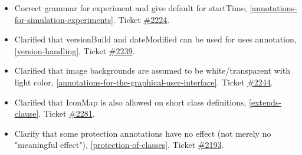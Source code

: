\begin{itemize}
\begin{itemize}
\item Correct grammar for experiment and give default for startTime, \cref{annotations-for-simulation-experiments}.
Ticket \href{https://github.com/modelica/ModelicaSpecification/issues/2224}{\#2224}.
\item Clarified that versionBuild and dateModified can be used for uses annotation, \cref{version-handling}.
Ticket \href{https://github.com/modelica/ModelicaSpecification/issues/2239}{\#2239}.
\item Clarified that image backgrounds are assumed to be white/transparent with light color, \cref{annotations-for-the-graphical-user-interface}.
Ticket \href{https://github.com/modelica/ModelicaSpecification/issues/2244}{\#2244}.
\item Clarified that IconMap is also allowed on short class definitions, \cref{extends-clause}.
Ticket \href{https://github.com/modelica/ModelicaSpecification/issues/2281}{\#2281}.
\item Clarify that some protection annotations have no effect (not merely no "meaningful effect"), \cref{protection-of-classes}.
Ticket \href{https://github.com/modelica/ModelicaSpecification/issues/2193}{\#2193}.
\end{itemize}


\end{itemize}
